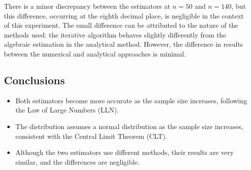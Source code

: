\documentclass{report}
\begin{document}
There is a minor discrepancy between the estimators at \(n = 50\) and \(n = 140\), but this difference, occurring at the eighth decimal place, is negligible in the context of this experiment.
The small difference can be attributed to the nature of the methods used: the iterative algorithm behaves slightly differently from the algebraic estimation in the analytical method.
However, the difference in results between the numerical and analytical approaches is minimal.

\subsection{Conclusions}\label{subsec:conclusions}
\begin{itemize}
    \item Both estimators become more accurate as the sample size increases, following the Law of Large Numbers (LLN).
    \item The distribution assumes a normal distribution as the sample size increases, consistent with the Central Limit Theorem (CLT).
    \item Although the two estimators use different methods, their results are very similar, and the differences are negligible.
\end{itemize}
\end{document}

